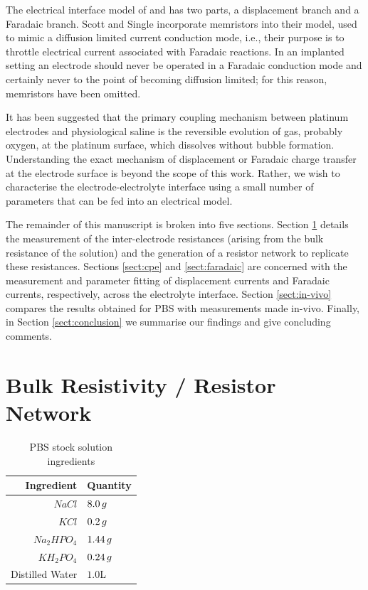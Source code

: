 \documentclass[journal, a4paper]{IEEEtran}
\begin{document}
The electrical interface model of \cite{Franks2005} and \cite{ScottSingle2013} has two parts, a displacement branch and a Faradaic branch.
{
    \color{blue}
    Scott and Single incorporate memristors into their model, used to mimic a diffusion limited current conduction mode, i.e., their purpose is to throttle electrical current associated with Faradaic reactions. In an implanted setting an electrode should never be operated in a Faradaic conduction mode and certainly never to the point of becoming diffusion limited; for this reason, memristors have been omitted.
}

It has been suggested that the primary coupling mechanism between platinum electrodes and physiological saline is the reversible evolution of gas, probably oxygen, at the platinum surface, which dissolves without bubble formation.\cite{Greatbatch1969} Understanding the exact mechanism of displacement or Faradaic charge transfer at the electrode surface is beyond the scope of this work. Rather, we wish to characterise the {electrode-electrolyte interface \color{blue} using a small} {\color{blue} number of} parameters that can be fed into an electrical model.

{
    \color{blue}
    The remainder of this manuscript is broken into five sections. Section \ref{sect:resistorMesh} details the measurement of the inter-electrode resistances {\color{blue}(arising from the bulk resistance of the solution)} and the generation of a resistor network to replicate these resistances.
    Sections \ref{sect:cpe} and \ref{sect:faradaic} are concerned with the measurement and parameter fitting of displacement currents and Faradaic currents, respectively, across the electrolyte interface. Section \ref{sect:in-vivo} compares the results obtained {\color{blue}for} PBS with measurements {\color{blue} made} in-vivo. Finally, in Section \ref{sect:conclusion} we summarise our findings and give concluding comments.
}


\section{{\color{blue}Bulk Resistivity / Resistor} Network }
\label{sect:resistorMesh}

\begin{table}
    \caption{PBS stock solution ingredients}
    \label{tab:PBSrecipe}
    \begin{center}
        \begin{tabular}{r | l}
            Ingredient & Quantity \\
            \hline
            $NaCl$ & $8.0\thinspace g$ \\
            $KCl$ & $0.2\thinspace g$ \\
            $Na_{2}HPO_{4}$ & $1.44\thinspace g$ \\
            $KH_{2}PO_{4}$ & $0.24\thinspace g$ \\
            Distilled Water & $1.0$\thinspace L \\
        \end{tabular}
    \end{center}
\end{table}
\end{document}
